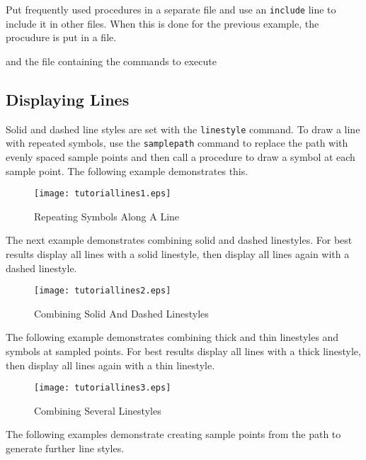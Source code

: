 Put frequently used procedures in a separate file and use an
\texttt{include}
line to include it in other files.  When this is done for the
previous example, the procudure is put in a file.



and the file containing the commands to execute



\subsection{Displaying Lines}

Solid and dashed line styles are set with the
\texttt{linestyle} command.  To draw a line with repeated symbols, use the
\texttt{samplepath}
command to replace the path with evenly spaced sample points and
then call a procedure to draw a symbol at each sample point.
The following example demonstrates this.



\begin{figure}[htb]
\texttt{[image: tutoriallines1.eps]}
\caption{Repeating Symbols Along A Line}
\label{tutoriallines1}
\end{figure}

The next example demonstrates
combining solid and dashed linestyles.
For best results display all lines with a solid linestyle,
then display all lines again with a dashed linestyle.



\begin{figure}[htb]
\texttt{[image: tutoriallines2.eps]}
\caption{Combining Solid And Dashed Linestyles}
\label{tutoriallines2}
\end{figure}

The following example demonstrates combining thick and
thin linestyles and symbols at sampled points.
For best results display all lines with a thick linestyle,
then display all lines again with a thin linestyle.



\begin{figure}[htb]
\texttt{[image: tutoriallines3.eps]}
\caption{Combining Several Linestyles}
\label{tutoriallines3}
\end{figure}

The following examples demonstrate creating sample points
from the path to generate further line styles.

